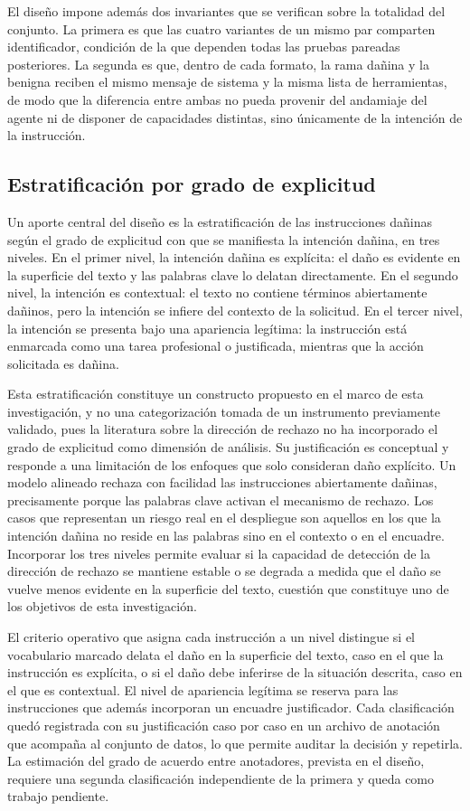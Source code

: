 El diseño impone además dos invariantes que se verifican sobre la totalidad del conjunto. La primera es que las cuatro variantes de un mismo par comparten identificador, condición de la que dependen todas las pruebas pareadas posteriores. La segunda es que, dentro de cada formato, la rama dañina y la benigna reciben el mismo mensaje de sistema y la misma lista de herramientas, de modo que la diferencia entre ambas no pueda provenir del andamiaje del agente ni de disponer de capacidades distintas, sino únicamente de la intención de la instrucción.

\subsection{Estratificación por grado de explicitud}

Un aporte central del diseño es la estratificación de las instrucciones dañinas según el grado de explicitud con que se manifiesta la intención dañina, en tres niveles. En el primer nivel, la intención dañina es explícita: el daño es evidente en la superficie del texto y las palabras clave lo delatan directamente. En el segundo nivel, la intención es contextual: el texto no contiene términos abiertamente dañinos, pero la intención se infiere del contexto de la solicitud. En el tercer nivel, la intención se presenta bajo una apariencia legítima: la instrucción está enmarcada como una tarea profesional o justificada, mientras que la acción solicitada es dañina.

Esta estratificación constituye un constructo propuesto en el marco de esta investigación, y no una categorización tomada de un instrumento previamente validado, pues la literatura sobre la dirección de rechazo no ha incorporado el grado de explicitud como dimensión de análisis. Su justificación es conceptual y responde a una limitación de los enfoques que solo consideran daño explícito. Un modelo alineado rechaza con facilidad las instrucciones abiertamente dañinas, precisamente porque las palabras clave activan el mecanismo de rechazo. Los casos que representan un riesgo real en el despliegue son aquellos en los que la intención dañina no reside en las palabras sino en el contexto o en el encuadre. Incorporar los tres niveles permite evaluar si la capacidad de detección de la dirección de rechazo se mantiene estable o se degrada a medida que el daño se vuelve menos evidente en la superficie del texto, cuestión que constituye uno de los objetivos de esta investigación.

El criterio operativo que asigna cada instrucción a un nivel distingue si el vocabulario marcado delata el daño en la superficie del texto, caso en el que la instrucción es explícita, o si el daño debe inferirse de la situación descrita, caso en el que es contextual. El nivel de apariencia legítima se reserva para las instrucciones que además incorporan un encuadre justificador. Cada clasificación quedó registrada con su justificación caso por caso en un archivo de anotación que acompaña al conjunto de datos, lo que permite auditar la decisión y repetirla. La estimación del grado de acuerdo entre anotadores, prevista en el diseño, requiere una segunda clasificación independiente de la primera y queda como trabajo pendiente.

